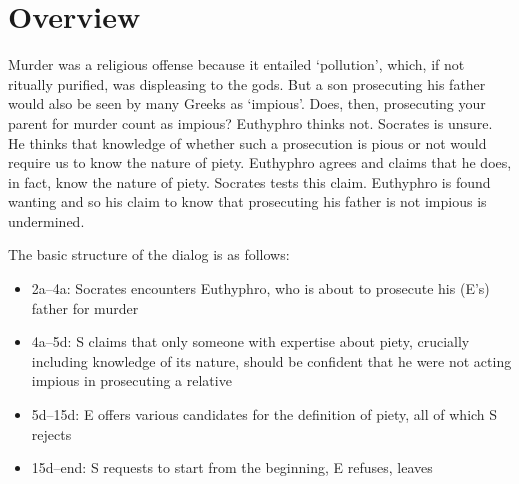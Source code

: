 \documentclass[oneside]{article}
\begin{document}
\section*{Overview}

Murder was a religious offense because it entailed `pollution', which, if not ritually purified, was displeasing to the gods. But a son prosecuting his father would also be seen by many Greeks as `impious'. Does, then, prosecuting your parent for murder count as impious? Euthyphro thinks not. Socrates is unsure. He thinks that knowledge of whether such a prosecution is pious or not would require us to know the nature of piety. Euthyphro agrees and claims that he does, in fact, know the nature of piety. Socrates tests this claim. Euthyphro  is found wanting and so his claim to know that prosecuting his father is not impious is undermined. 

The basic structure of the dialog is as follows: 
\begin{itemize}\item{2a--4a: Socrates encounters Euthyphro, who is about to prosecute his (E's) father for murder}\item{4a--5d: S claims that only someone with expertise about piety, crucially including knowledge of its nature, should be confident that he were not acting impious in prosecuting a relative}\item{5d--15d: E offers various candidates for the definition of piety, all of which S rejects}\item{15d--end: S requests to start from the beginning, E refuses, leaves}\end{itemize}



\end{document}
